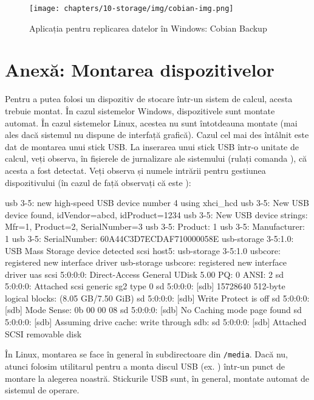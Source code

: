\begin{figure}[!htbp]
	\centering
	\texttt{[image: chapters/10-storage/img/cobian-img.png]}
	\caption{Aplicația pentru replicarea datelor în Windows: Cobian Backup}
	\label{fig:storage:cobian}
\end{figure}

\section{Anexă: Montarea dispozitivelor}
\label{sec:storage:mount-cmd}

Pentru a putea folosi un dispozitiv de stocare într-un sistem de calcul, acesta
trebuie montat. În cazul sistemelor Windows, dispozitivele sunt montate automat.
În cazul sistemelor Linux, acestea nu sunt întotdeauna montate (mai ales dacă
sistemul nu dispune de interfață grafică). Cazul cel mai des întâlnit este dat de montarea
unui stick USB. La inserarea unui stick USB într-o unitate de calcul, veți
observa, în fișierele de jurnalizare ale sistemului (rulați comanda ), că acesta a
fost detectat. Veți observa și numele intrării pentru gestiunea dispozitivului (în cazul de față observați că
este ):

\begin{screen}
usb 3-5: new high-speed USB device number 4 using xhci_hcd
usb 3-5: New USB device found, idVendor=abcd, idProduct=1234
usb 3-5: New USB device strings: Mfr=1, Product=2, SerialNumber=3
usb 3-5: Product: 1
usb 3-5: Manufacturer: 1
usb 3-5: SerialNumber: 60A44C3D7ECDAF710000058E
usb-storage 3-5:1.0: USB Mass Storage device detected
scsi host5: usb-storage 3-5:1.0
usbcore: registered new interface driver usb-storage
usbcore: registered new interface driver uas
scsi 5:0:0:0: Direct-Access     General  UDisk            5.00 PQ: 0 ANSI: 2
sd 5:0:0:0: Attached scsi generic sg2 type 0
sd 5:0:0:0: [sdb] 15728640 512-byte logical blocks: (8.05 GB/7.50 GiB)
sd 5:0:0:0: [sdb] Write Protect is off
sd 5:0:0:0: [sdb] Mode Sense: 0b 00 00 08
sd 5:0:0:0: [sdb] No Caching mode page found
sd 5:0:0:0: [sdb] Assuming drive cache: write through
 sdb:
sd 5:0:0:0: [sdb] Attached SCSI removable disk
\end{screen}

În Linux, montarea se face în general în subdirectoare din \texttt{/media}.
Dacă nu, atunci folosim utilitarul  pentru a monta discul USB (ex. ) într-un punct de montare la alegerea noastră.
Stickurile USB sunt, în general, montate automat de sistemul de operare.

